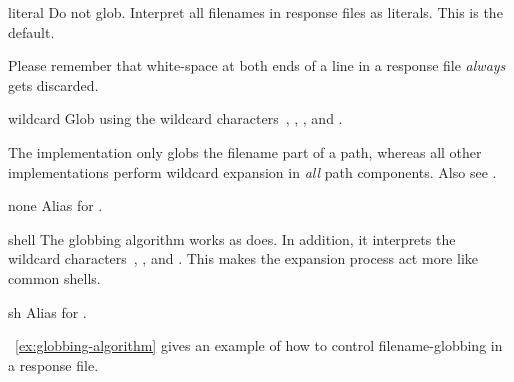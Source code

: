\begin{table}
  \begin{minipage}{\linewidth}
    \begin{codelist}
    \item[literal]\itemend
      Do not glob.  Interpret all filenames in response files as literals.  This is the default.

      Please remember that white-space at both ends of a line in a response file \emph{always}
      gets discarded.

    \item[wildcard]\itemend
      Glob using the wildcard characters~, \sample{*}, \sample{[}, and \sample{]}.

      The  implementation only globs the filename part of a path, whereas all
      other implementations perform wildcard expansion in \emph{all} path components.  Also see
      .

    \item[none]\itemend
      Alias for .

    \item[shell]\itemend
      The  globbing algorithm works as  does.  In addition, it
      interprets the wildcard characters~\sample{\{}, \sample{\atsign}, and \sample{\squiggle}.
      This makes the expansion process act more like common  shells.

    \item[sh]\itemend
      Alias for .
    \end{codelist}
  \end{minipage}

  \caption[Globbing algorithms]{\label{tab:globbing-algorithms}%
    Globbing algorithms for the use in response files.}
\end{table}

\exampleName~\ref{ex:globbing-algorithm} gives an example of how to control filename-globbing in
a response file.

